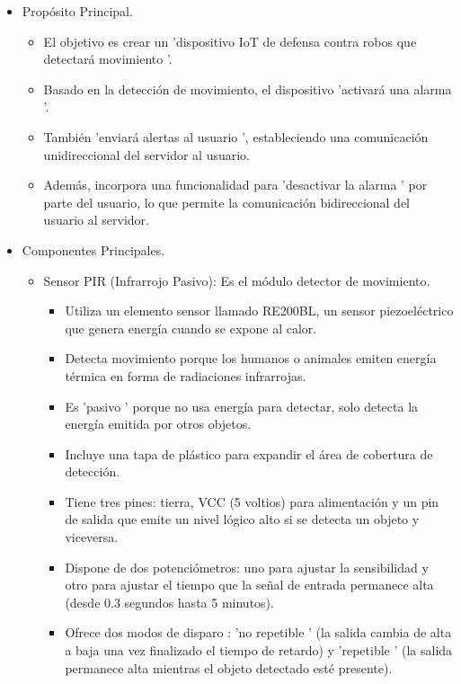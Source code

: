\documentclass{report}
\begin{document}
\begin{itemize}
\item Propósito Principal.
    \begin{itemize}
        \item El objetivo es crear un  'dispositivo IoT de defensa contra robos que detectará movimiento '.
        \item Basado en la detección de movimiento, el dispositivo  'activará una alarma '.
        \item También  'enviará alertas al usuario ', estableciendo una comunicación unidireccional del servidor al usuario.
        \item Además, incorpora una funcionalidad para  'desactivar la alarma ' por parte del usuario, lo que permite la comunicación bidireccional del 
        usuario al servidor.
    \end{itemize}
\item Componentes Principales.
    \begin{itemize}
        \item Sensor PIR (Infrarrojo Pasivo): Es el módulo detector de movimiento.
        \begin{itemize}
            \item Utiliza un elemento sensor llamado RE200BL, un sensor piezoeléctrico que genera energía cuando se expone al calor.
            \item Detecta movimiento porque los humanos o animales emiten energía térmica en forma de radiaciones infrarrojas.
            \item Es  'pasivo ' porque no usa energía para detectar, solo detecta la energía emitida por otros objetos.
            \item Incluye una tapa de plástico para expandir el área de cobertura de detección.
            \item Tiene tres pines: tierra, VCC (5 voltios) para alimentación y un pin de salida que emite un nivel lógico alto si se detecta un objeto 
            y viceversa.
            \item Dispone de dos potenciómetros: uno para ajustar la sensibilidad y otro para ajustar el tiempo que la señal de entrada permanece alta 
            (desde 0.3 segundos hasta 5 minutos).
            \item Ofrece  dos modos de disparo :  'no repetible ' (la salida cambia de alta a baja una vez finalizado el tiempo de retardo) y  'repetible ' 
            (la salida permanece alta mientras el objeto detectado esté presente).

\end{itemize}
\end{itemize}
\end{itemize}
\end{document}

